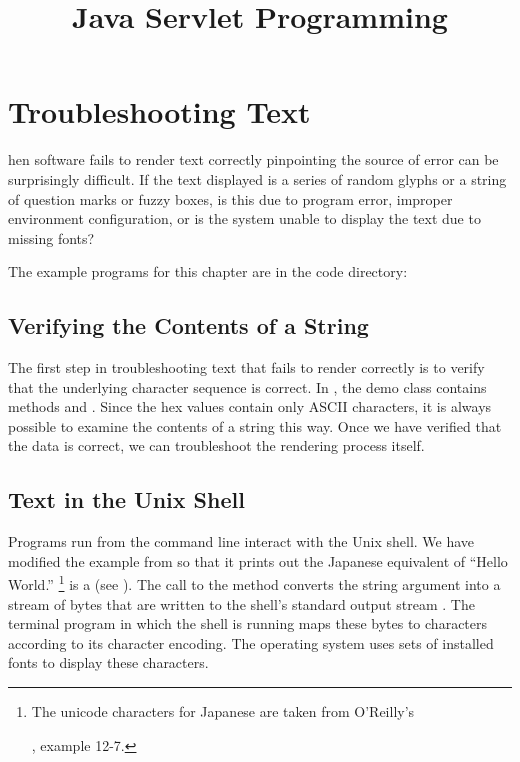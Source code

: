 \chapter{Troubleshooting Text}\label{chap:text-trouble}

hen software fails to render text correctly
pinpointing the source of error can be surprisingly difficult.
If the text displayed is a series of random glyphs or a string of
question marks or fuzzy boxes, is this due to program error,
improper environment configuration, or is the system unable to
display the text due to missing fonts?


The example programs for this chapter are in the code directory:
%

\section{Verifying the Contents of a String}

The first step in troubleshooting text that fails to render correctly
is to verify that the underlying character sequence is correct.
In  , the
demo class  contains 
methods  and .
%
%
Since the hex values contain only ASCII characters, it is always possible
to examine the contents of a string this way.
Once we have verified that the data is correct, we can
troubleshoot the rendering process itself.

\section{Text in the Unix Shell}

Programs run from the command line interact with the Unix shell.
We have modified the  example from 
so that it prints out the Japanese equivalent of ``Hello World.''%
%
\footnote{The unicode characters for Japanese are taken from
O'Reilly's \title{Java Servlet Programming}, example 12-7.}
%
%
 is a  (see ).
The call to the  method converts the string argument into 
a stream of bytes that are written to the shell's standard output stream .
The terminal program in which the shell is running maps 
these bytes to characters according to its character encoding.
The operating system uses sets of installed fonts to display these characters.

